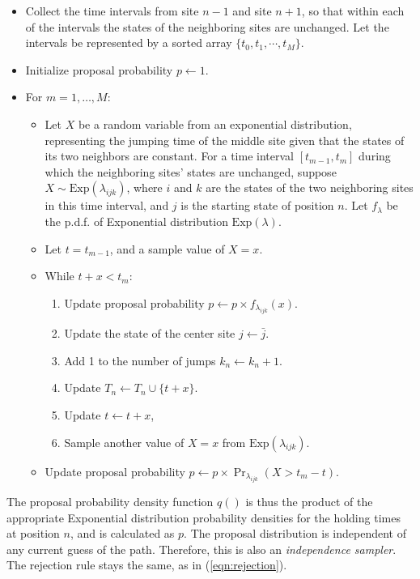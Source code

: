 \documentclass[11pt]{article}
\begin{document}
\begin{itemize}
\item Collect the time intervals from site $n-1$ and site $n+1$, so
  that within each of the intervals the states of the neighboring
  sites are unchanged. Let the intervals be represented by a sorted
  array $\{t_0, t_1, \cdots, t_M\}$.
\item Initialize proposal probability $p\leftarrow 1$.
\item For $m = 1, \ldots, M$:
  \begin{itemize}
  \item Let $X$ be a random variable from an exponential distribution,
    representing the jumping time of the middle site given that the states
    of its two neighbors are constant.  For a time interval $[t_{m-1},
    t_m]$ during which the neighboring sites' states are unchanged,
    suppose $X \sim \text{Exp}(\lambda_{ijk})$, where $i$ and $k$ are the
    states of the two neighboring sites in this time interval, and $j$ is
    the starting state of position $n$. Let $f_{\lambda}$ be the p.d.f. of
    Exponential distribution $\text{Exp}(\lambda)$.
  \item Let $t = t_{m-1}$, and a sample value of $X=x$.
  \item While $t + x < t_m$:
    \begin{enumerate}[label={(\arabic*)}]
    \item Update proposal probability $p \leftarrow p\times f_{\lambda_{ijk}}(x)$.
    \item Update the state of the center site $j \leftarrow \bar{j}$.
    \item Add 1 to the number of jumps $k_n \leftarrow k_n +1$.
    \item Update $T_n \leftarrow T_n\cup\{t+x\}$.
    \item Update $t \leftarrow  t+x$,
    \item Sample another value of $X=x$ from $\text{Exp}(\lambda_{ijk})$.
    \end{enumerate}
  \item Update proposal probability $p \leftarrow p\times \Pr_{\lambda_{ijk}}(X > t_m - t )$.
  \end{itemize}
\end{itemize}

The proposal probability density function $q()$ is thus the product of
the appropriate Exponential distribution probability densities for the
holding times at position $n$, and is calculated as $p$. The proposal
distribution is independent of any current guess of the
path. Therefore, this is also an \textit{independence sampler}. The
rejection rule stays the same, as in (\ref{eqn:rejection}).
\end{document}
